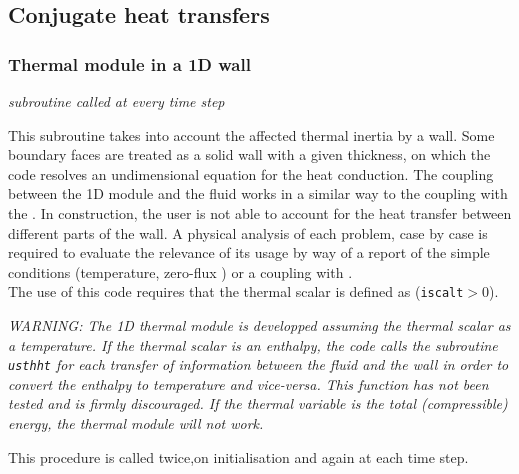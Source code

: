 {{{%
\subsection{Conjugate heat transfers}
\subsubsection{Thermal module in a 1D wall}

\noindent
\textit{subroutine called at every time step}

This subroutine takes into account the affected thermal inertia by a wall.
 Some boundary faces are treated as a solid wall with a given thickness, on
 which the code resolves an undimensional equation for the heat conduction.
 The coupling between the 1D module and the fluid works in a similar way to
 the coupling with the \syrthes. In construction, the user is not able to
 account for the heat transfer between different parts of the wall. A physical
 analysis of each problem, case by case is required to evaluate the relevance
 of its usage by way of a report of the simple conditions (temperature, zero-flux
 ) or a coupling with \syrthes.\\

The use of this code requires that the thermal scalar is
defined as (\texttt{iscalt}$>0$).

{\em WARNING: The 1D thermal module is developped assuming the thermal scalar
 as a temperature. If the thermal scalar is an enthalpy, the code calls the
 subroutine \texttt{usthht} for each transfer of information between the fluid
 and the wall in order to convert the enthalpy to temperature and vice-versa.
 This function has not been tested and is firmly discouraged. If the thermal
 variable is the total (compressible) energy, the thermal module will not work.}

\bigskip

This procedure  is called twice,on initialisation and again at each time step.

}}}
